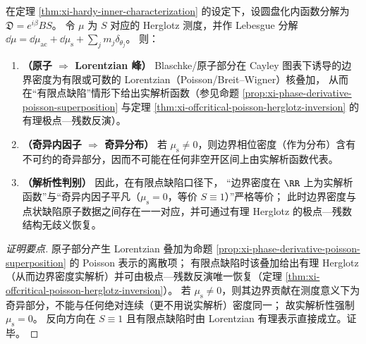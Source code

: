 \begin{proposition}\label{prop:xi-analytic-boundary-density-iff-no-singular-inner}
在定理 \ref{thm:xi-hardy-inner-characterization} 的设定下，设圆盘化内函数分解为
\(
\mathfrak{D}=e^{i\beta}BS
\)。
令 \(\mu\) 为 \(S\) 对应的 Herglotz 测度，并作 Lebesgue 分解
\(
\dd\mu=\dd\mu_{\mathrm{ac}}+\dd\mu_{\mathrm{s}}+\sum_j m_j\delta_{\theta_j}
\)。
则：
\begin{enumerate}
  \item \textbf{（原子 \(\Rightarrow\) Lorentzian 峰）}
  Blaschke/原子部分在 Cayley 图表下诱导的边界密度为有限或可数的 Lorentzian（Poisson/Breit--Wigner）核叠加，
  从而在“有限点缺陷”情形下给出实解析函数（参见命题 \ref{prop:xi-phase-derivative-poisson-superposition} 与定理 \ref{thm:xi-offcritical-poisson-herglotz-inversion} 的有理极点—残数反演）。
  \item \textbf{（奇异内因子 \(\Rightarrow\) 奇异分布）}
  若 \(\mu_{\mathrm{s}}\neq 0\)，则边界相位密度（作为分布）含有不可约的奇异部分，因而不可能在任何非空开区间上由实解析函数代表。
  \item \textbf{（解析性判别）}
  因此，在有限点缺陷口径下，
  “边界密度在 \(\RR\) 上为实解析函数”与“奇异内因子平凡（\(\mu_{\mathrm{s}}=0\)，等价 \(S\equiv 1\)）”严格等价；
  此时边界密度与点状缺陷原子数据之间存在一一对应，并可通过有理 Herglotz 的极点—残数结构无歧义恢复。
\end{enumerate}
\end{proposition}

\begin{proof}[证明要点]
原子部分产生 Lorentzian 叠加为命题 \ref{prop:xi-phase-derivative-poisson-superposition} 的 Poisson 表示的离散项；
有限点缺陷时该叠加给出有理 Herglotz（从而边界密度实解析）并可由极点—残数反演唯一恢复（定理 \ref{thm:xi-offcritical-poisson-herglotz-inversion}）。
若 \(\mu_{\mathrm{s}}\neq 0\)，则其边界贡献在测度意义下为奇异部分，不能与任何绝对连续（更不用说实解析）密度同一；
故实解析性强制 \(\mu_{\mathrm{s}}=0\)。
反向方向在 \(S\equiv 1\) 且有限点缺陷时由 Lorentzian 有理表示直接成立。证毕。
\end{proof}

